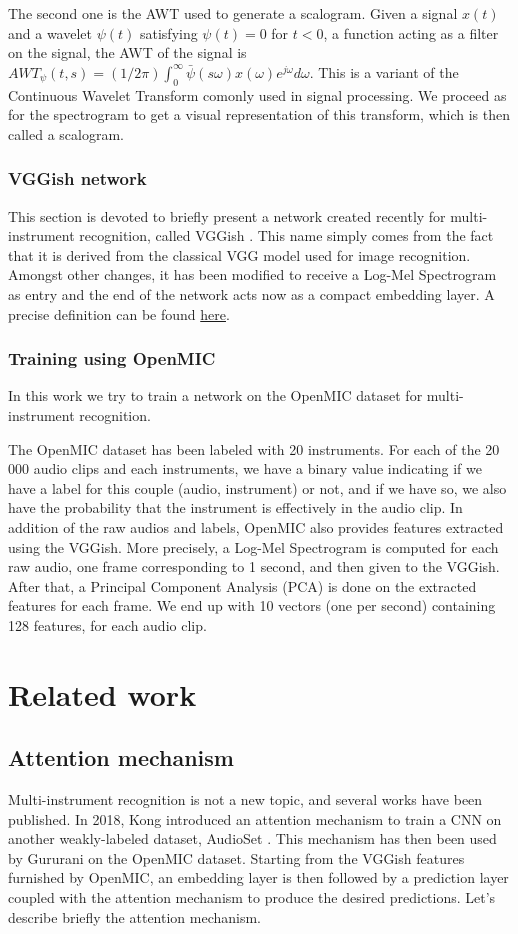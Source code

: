 \documentclass[final]{cvpr}
\begin{document}
The second one is the AWT used to generate a scalogram. Given a signal $x(t)$ and a wavelet $\psi(t)$ satisfying $\psi(t)=0$ for $t<0$, a function acting as a filter on the signal, the AWT of the signal is $AWT_{\psi}(t,s)=(1/2\pi)\int_0^\infty \bar{\psi}(s\omega)x(\omega)e^{j\omega}d\omega$. This is a variant of the Continuous Wavelet Transform comonly used in signal processing. We proceed as for the spectrogram to get a visual representation of this transform, which is then called a scalogram.
\subsubsection{VGGish network}
This section is devoted to briefly present a network created recently for multi-instrument recognition, called VGGish \cite{VGGish_net}. This name simply comes from the fact that it is derived from the classical VGG model \cite{vgg} used for image recognition. Amongst other changes, it has been modified to receive a Log-Mel Spectrogram as entry and the end of the network acts now as a compact embedding layer. A precise definition can be found \href{https://github.com/tensorflow/models/tree/master/research/audioset/vggish}{here}.
\subsubsection{Training using OpenMIC}
In this work we try to train a network on the OpenMIC dataset for multi-instrument recognition. 

The OpenMIC dataset has been labeled with 20 instruments. For each of the 20 000 audio clips and each instruments, we have a binary value indicating if we have a label for this couple (audio, instrument) or not, and if we have so, we also have the probability that the instrument is effectively in the audio clip. In addition of the raw audios and labels, OpenMIC also provides features extracted using the VGGish. More precisely, a Log-Mel Spectrogram is computed for each raw audio, one frame corresponding to 1 second, and then given to the VGGish. After that, a Principal Component Analysis (PCA) is done on the extracted features for each frame. We end up with 10 vectors (one per second) containing 128 features, for each audio clip.
\section{Related work}
\subsection{Attention mechanism}
Multi-instrument recognition is not a new topic, and several works have been published. In 2018, Kong \etal \cite{kong} introduced an attention mechanism to train a CNN on another weakly-labeled dataset, AudioSet \cite{audioset}. This mechanism has then been used by Gururani \etal \cite{attention} on the OpenMIC dataset. Starting from the VGGish features furnished by OpenMIC, an embedding layer is then followed by a prediction layer coupled with the attention mechanism to produce the desired predictions. Let's describe briefly the attention mechanism. 
\end{document}
